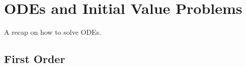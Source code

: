 \section{ODEs and Initial Value Problems}

A recap on how to solve ODEs.

\subsection{First Order}

